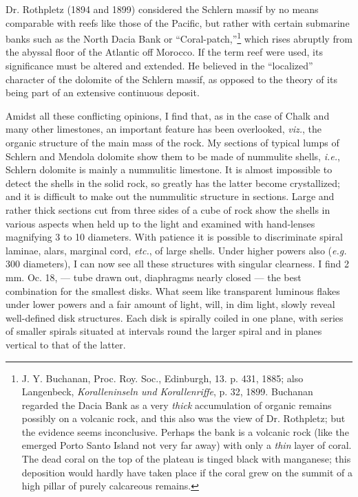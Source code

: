 \documentclass[a4paper, 12pt, oneside]{article}
\begin{document}
Dr. Rothpletz (1894 and 1899) considered the Schlern massif by no means comparable with reefs like those of the Pacific, but rather with certain submarine banks such as the North Dacia Bank or ``Coral-patch,''\footnote{J. Y. Buchanan, Proc. Roy. Soc., Edinburgh, 13. p. 431, 1885; also Langenbeck, \emph{Koralleninseln und Korallenriffe}, p. 32, 1899. Buchanan regarded the Dacia Bank as a very \emph{thick} accumulation of organic remains possibly on a volcanic rock, and this also was the view of Dr. Rothpletz; but the evidence seems inconclusive. Perhaps the bank is a volcanic rock (like the emerged Porto Santo Island not very far away) with only a \emph{thin} layer of coral. The dead coral on the top of the plateau is tinged black with manganese; this deposition would hardly have taken place if the coral grew on the summit of a high pillar of purely calcareous remains.} which rises abruptly from the abyssal floor of the Atlantic off Morocco. If the term reef were used, its significance must be altered and extended. He believed in the ``localized'' character of the dolomite of the Schlern massif, as opposed to the theory of its being part of an extensive continuous deposit.

Amidst all these conflicting opinions, I find that, as in the case of Chalk and many other limestones, an important feature has been overlooked, \emph{viz.}, the organic structure of the main mass of the rock. My sections of typical lumps of Schlern and Mendola dolomite show them to be made of nummulite shells, \emph{i.e.}, Schlern dolomite is mainly a nummulitic limestone. It is almost impossible to detect the shells in the solid rock, so greatly has the latter become crystallized; and it is difficult to make out the nummulitic structure in sections. Large and rather thick sections cut from three sides of a cube of rock show the shells in various aspects when held up to the light and examined with hand-lenses magnifying 3 to 10 diameters. With patience it is possible to discriminate spiral laminae, alars, marginal cord, \emph{etc.}, of large shells. Under higher powers also (\emph{e.g.} 300 diameters), I can now see all these structures with singular clearness. I find 2 mm. Oc. 18, --- tube drawn out, diaphragms nearly closed --- the best combination for the smallest disks. What seem like transparent luminous flakes under lower powers and a fair amount of light, will, in dim light, slowly reveal well-defined disk structures. Each disk is spirally coiled in one plane, with series of smaller spirals situated at intervals round the larger spiral and in planes vertical to that of the latter.
\end{document}
